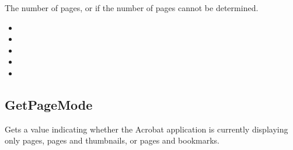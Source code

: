 \documentclass[letterpaper,12pt,english,openany,oneside]{sphinxmanual}
\begin{document}
\begin{sphinxVerbatim}[commandchars=\\\{\}]
 
\end{sphinxVerbatim}


The number of pages, or  if the number of pages cannot be determined.

\label{\detokenize{IAC_API_OLE_Objects:related-methods-100}}
\begin{itemize}
\item {} 
 

\item {} 
 

\item {} 
 

\item {} 
 

\item {} 
 

\end{itemize}




\subsection{GetPageMode}
\label{\detokenize{IAC_API_OLE_Objects:getpagemode}}
Gets a value indicating whether the Acrobat application is currently displaying only pages, pages and thumbnails, or pages and bookmarks.


\begin{sphinxVerbatim}[commandchars=\\\{\}]
 
\end{sphinxVerbatim}

\end{document}
